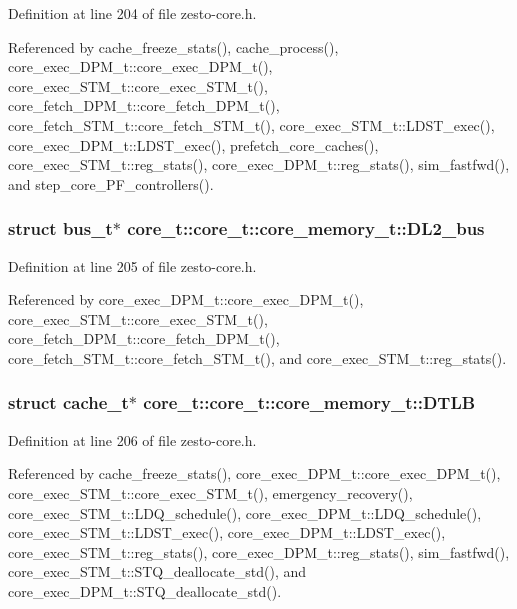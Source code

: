 Definition at line 204 of file zesto-core.h.

Referenced by cache\_\-freeze\_\-stats(), cache\_\-process(), core\_\-exec\_\-DPM\_\-t::core\_\-exec\_\-DPM\_\-t(), core\_\-exec\_\-STM\_\-t::core\_\-exec\_\-STM\_\-t(), core\_\-fetch\_\-DPM\_\-t::core\_\-fetch\_\-DPM\_\-t(), core\_\-fetch\_\-STM\_\-t::core\_\-fetch\_\-STM\_\-t(), core\_\-exec\_\-STM\_\-t::LDST\_\-exec(), core\_\-exec\_\-DPM\_\-t::LDST\_\-exec(), prefetch\_\-core\_\-caches(), core\_\-exec\_\-STM\_\-t::reg\_\-stats(), core\_\-exec\_\-DPM\_\-t::reg\_\-stats(), sim\_\-fastfwd(), and step\_\-core\_\-PF\_\-controllers().
\subsubsection[{DL2\_\-bus}]{\setlength{\rightskip}{0pt plus 5cm}struct {\bf bus\_\-t}$\ast$ core\_\-t::core\_\-t::core\_\-memory\_\-t::DL2\_\-bus\hspace{0.3cm}{\tt  [read]}}\label{structcore__t_1_1core__memory__t_8924d67219e4fbf56363be1d20d57d87}




Definition at line 205 of file zesto-core.h.

Referenced by core\_\-exec\_\-DPM\_\-t::core\_\-exec\_\-DPM\_\-t(), core\_\-exec\_\-STM\_\-t::core\_\-exec\_\-STM\_\-t(), core\_\-fetch\_\-DPM\_\-t::core\_\-fetch\_\-DPM\_\-t(), core\_\-fetch\_\-STM\_\-t::core\_\-fetch\_\-STM\_\-t(), and core\_\-exec\_\-STM\_\-t::reg\_\-stats().
\subsubsection[{DTLB}]{\setlength{\rightskip}{0pt plus 5cm}struct {\bf cache\_\-t}$\ast$ core\_\-t::core\_\-t::core\_\-memory\_\-t::DTLB\hspace{0.3cm}{\tt  [read]}}\label{structcore__t_1_1core__memory__t_503b1a0b936482ad183fef9ee544d1f8}




Definition at line 206 of file zesto-core.h.

Referenced by cache\_\-freeze\_\-stats(), core\_\-exec\_\-DPM\_\-t::core\_\-exec\_\-DPM\_\-t(), core\_\-exec\_\-STM\_\-t::core\_\-exec\_\-STM\_\-t(), emergency\_\-recovery(), core\_\-exec\_\-STM\_\-t::LDQ\_\-schedule(), core\_\-exec\_\-DPM\_\-t::LDQ\_\-schedule(), core\_\-exec\_\-STM\_\-t::LDST\_\-exec(), core\_\-exec\_\-DPM\_\-t::LDST\_\-exec(), core\_\-exec\_\-STM\_\-t::reg\_\-stats(), core\_\-exec\_\-DPM\_\-t::reg\_\-stats(), sim\_\-fastfwd(), core\_\-exec\_\-STM\_\-t::STQ\_\-deallocate\_\-std(), and core\_\-exec\_\-DPM\_\-t::STQ\_\-deallocate\_\-std().
